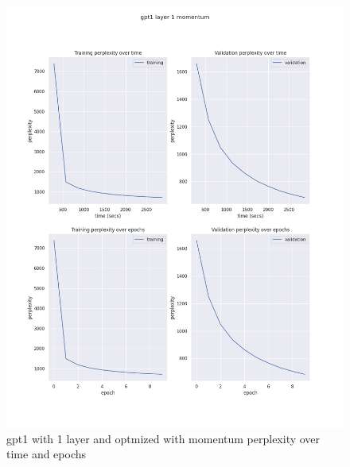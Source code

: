 \documentclass[12pt]{article}
\theoremstyle{definition}
\begin{document}
\begin{figure}[H]
     \centering
     \includegraphics[scale=0.4]{gpt1_layer_1_momentum.png}
     \caption{gpt1 with 1 layer and optmized with momentum perplexity over time and epochs}
\end{figure}
\end{document}
